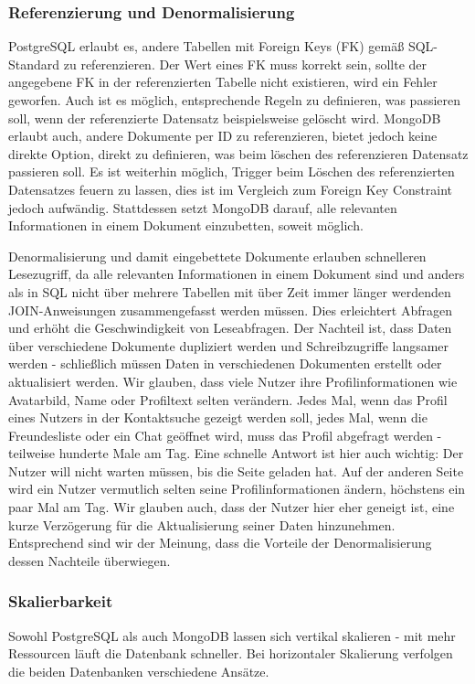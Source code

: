 \subsubsection{Referenzierung und Denormalisierung}
PostgreSQL erlaubt es, andere Tabellen mit Foreign Keys (FK) gemäß SQL-Standard zu referenzieren. Der Wert eines FK muss korrekt sein, sollte der angegebene FK in der referenzierten Tabelle nicht existieren, wird ein Fehler geworfen. Auch ist es möglich, entsprechende Regeln zu definieren, was passieren soll, wenn der referenzierte Datensatz beispielsweise gelöscht wird.
MongoDB erlaubt auch, andere Dokumente per ID zu referenzieren, bietet jedoch keine direkte Option, direkt zu definieren, was beim löschen des referenzieren Datensatz passieren soll. Es ist weiterhin möglich, Trigger beim Löschen des referenzierten Datensatzes feuern zu lassen, dies ist im Vergleich zum Foreign Key Constraint jedoch aufwändig. Stattdessen setzt MongoDB darauf, alle relevanten Informationen in einem Dokument einzubetten, soweit möglich.

Denormalisierung und damit eingebettete Dokumente erlauben schnelleren Lesezugriff, da alle relevanten Informationen in einem Dokument sind und anders als in SQL nicht über mehrere Tabellen mit über Zeit immer länger werdenden JOIN-Anweisungen zusammengefasst werden müssen. Dies erleichtert Abfragen und erhöht die Geschwindigkeit von Leseabfragen. Der Nachteil ist, dass Daten über verschiedene Dokumente dupliziert werden und Schreibzugriffe langsamer werden - schließlich müssen Daten in verschiedenen Dokumenten erstellt oder aktualisiert werden. 
Wir glauben, dass viele Nutzer ihre Profilinformationen wie Avatarbild, Name oder Profiltext selten verändern. Jedes Mal, wenn das Profil eines Nutzers in der Kontaktsuche gezeigt werden soll, jedes Mal, wenn die Freundesliste oder ein Chat geöffnet wird, muss das Profil abgefragt werden - teilweise hunderte Male am Tag. Eine schnelle Antwort ist hier auch wichtig: Der Nutzer will nicht warten müssen, bis die Seite geladen hat. Auf der anderen Seite wird ein Nutzer vermutlich selten seine Profilinformationen ändern, höchstens ein paar Mal am Tag. Wir glauben auch, dass der Nutzer hier eher geneigt ist, eine kurze Verzögerung für die Aktualisierung seiner Daten hinzunehmen. Entsprechend sind wir der Meinung, dass
die Vorteile der Denormalisierung dessen Nachteile überwiegen.

\subsubsection{Skalierbarkeit}
Sowohl PostgreSQL als auch MongoDB lassen sich vertikal skalieren - mit mehr Ressourcen läuft die Datenbank schneller. Bei horizontaler Skalierung verfolgen die beiden Datenbanken verschiedene Ansätze.
